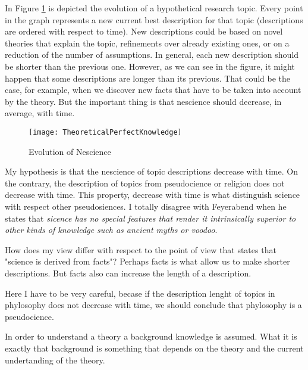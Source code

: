 \begin{example}
In Figure \ref{fig:TheoreticalPerfectKnowledge} is depicted the evolution of a hypothetical research topic. Every point in the graph represents a new current best description for that topic (descriptions are ordered with respect to time). New descriptions could be based on novel theories that explain the topic, refinements over already existing ones, or on a reduction of the number of assumptions. In general, each new description should be shorter than the previous one. However, as we can see in the figure, it might happen that some descriptions are longer than its previous. That could be the case, for example, when we discover new facts that have to be taken into account by the theory. But the important thing is that nescience should decrease, in average, with time.
\end{example}

\begin{figure}[h]
\centering\texttt{[image: TheoreticalPerfectKnowledge]}
\caption{\label{fig:TheoreticalPerfectKnowledge}Evolution of Nescience}
\end{figure}

My hypothesis is that the nescience of topic descriptions decrease with time. On the contrary, the description of topics from pseudocience or religion does not decrease with time. This property, decrease with time is what distinguish science with respect other pseudosiences. I totally disagree with Feyerabend when he states that \emph{sicence has no special features that render it intrinsically superior to other kinds of knowledge such as ancient myths or voodoo}.

How does my view differ with respect to the point of view that states that "science is derived from facts"? Perhaps facts is what allow us to make shorter descriptions. But facts also can increase the length of a description.

Here I have to be very careful, becase if the description lenght of topics in phylosophy does not decrease with time, we should conclude that phylosophy is a pseudocience.

In order to understand a theory a background knowledge is assumed. What it is exactly that background is something that depends on the theory and the current undertanding of the theory.

